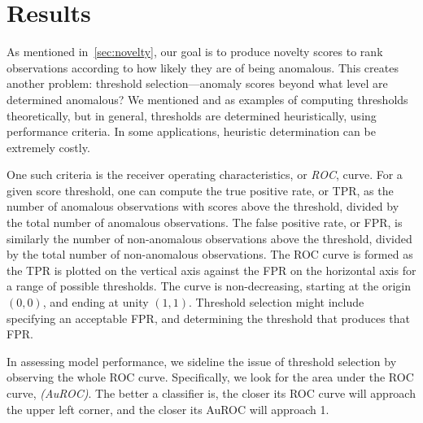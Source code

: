 \section{Results\label{sec:results}}
As mentioned in~\ref{sec:novelty}, our goal is 
    to produce novelty scores to rank observations according to how likely 
    they are of being anomalous.  This creates another problem: threshold 
    selection---anomaly scores beyond what level are determined anomalous?  We 
    mentioned \cite{clifton2011} and \cite{gu2021} as examples of computing 
    thresholds theoretically, but in general, thresholds are determined 
    heuristically, using performance criteria.  In some applications, 
    heuristic determination can be extremely costly.

One such criteria is the receiver operating characteristics, or \emph{ROC}, 
    curve.  For  a given score threshold, one can compute the true positive 
    rate, or TPR, as the number of anomalous observations with scores above the 
    threshold, divided by the total number of anomalous observations.  The 
    false positive rate, or FPR, is similarly the number of non-anomalous 
    observations above the threshold, divided by the total number of 
    non-anomalous observations.  The ROC curve is formed as the TPR is plotted 
    on the vertical axis against the FPR on the horizontal axis for a range of 
    possible thresholds.  The curve is non-decreasing, starting at the origin 
    $(0,0)$, and ending at unity $(1,1)$.  Threshold selection might include 
    specifying an acceptable FPR, and determining the threshold that produces 
    that FPR.

In assessing model performance, we sideline the issue of threshold selection by 
    observing the whole ROC curve.  Specifically, we look for the area under 
    the ROC curve, \emph{(AuROC)}.  The better a classifier is, the closer its 
    ROC curve will approach the upper left corner, and the closer its AuROC will 
    approach 1.



